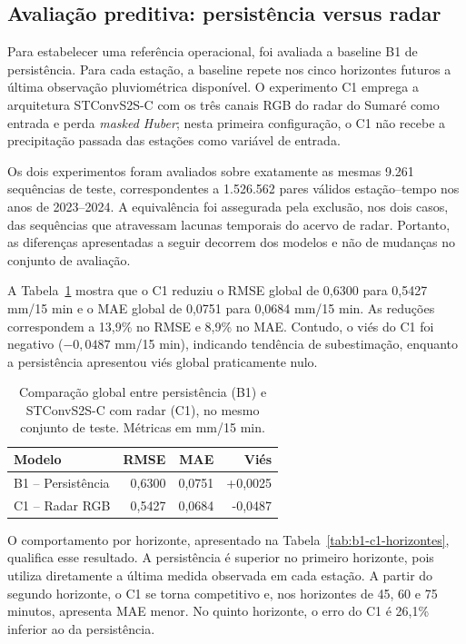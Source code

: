 
\subsection{Avaliação preditiva: persistência versus radar}
Para estabelecer uma referência operacional, foi avaliada a baseline B1 de persistência. Para cada estação, a baseline repete nos cinco horizontes futuros a última observação pluviométrica disponível. O experimento C1 emprega a arquitetura STConvS2S-C com os três canais RGB do radar do Sumaré como entrada e perda \textit{masked Huber}; nesta primeira configuração, o C1 não recebe a precipitação passada das estações como variável de entrada.

Os dois experimentos foram avaliados sobre exatamente as mesmas 9.261 sequências de teste, correspondentes a 1.526.562 pares válidos estação--tempo nos anos de 2023--2024. A equivalência foi assegurada pela exclusão, nos dois casos, das sequências que atravessam lacunas temporais do acervo de radar. Portanto, as diferenças apresentadas a seguir decorrem dos modelos e não de mudanças no conjunto de avaliação.

A Tabela~\ref{tab:b1-c1-global} mostra que o C1 reduziu o RMSE global de 0,6300 para 0,5427 mm/15 min e o MAE global de 0,0751 para 0,0684 mm/15 min. As reduções correspondem a 13,9\% no RMSE e 8,9\% no MAE. Contudo, o viés do C1 foi negativo ($-0,0487$ mm/15 min), indicando tendência de subestimação, enquanto a persistência apresentou viés global praticamente nulo.

\begin{table}[htbp]
\centering
\caption{Comparação global entre persistência (B1) e STConvS2S-C com radar (C1), no mesmo conjunto de teste. Métricas em mm/15 min.}
\label{tab:b1-c1-global}
\begin{tabular}{lrrr}
\toprule
\textbf{Modelo} & \textbf{RMSE} & \textbf{MAE} & \textbf{Viés} \\
\midrule
B1 -- Persistência & 0,6300 & 0,0751 & +0,0025 \\
C1 -- Radar RGB & 0,5427 & 0,0684 & -0,0487 \\
\bottomrule
\end{tabular}
\end{table}

O comportamento por horizonte, apresentado na Tabela~\ref{tab:b1-c1-horizontes}, qualifica esse resultado. A persistência é superior no primeiro horizonte, pois utiliza diretamente a última medida observada em cada estação. A partir do segundo horizonte, o C1 se torna competitivo e, nos horizontes de 45, 60 e 75 minutos, apresenta MAE menor. No quinto horizonte, o erro do C1 é 26,1\% inferior ao da persistência.

